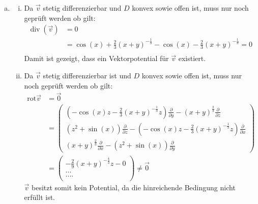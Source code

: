 \documentclass[10pt,a4paper,parskip=half]{scrartcl}
\begin{document}
\begin{enumerate}[(a)]
\begin{enumerate}[1.]
\end{enumerate}
\item 
\begin{enumerate}[(i)]
	\item 
Da $\vec v$ stetig differenzierbar und $D$ konvex sowie offen ist, muss nur noch geprüft werden ob gilt:
\begin{align*}
\operatorname{div} ( \vec v ) &= 0\\
&= \cos(x) + \frac 23(x+y)^{-\frac 13} - \cos (x) - \frac 23(x+y)^{-\frac 13} = 0\\
\end{align*}
Damit ist gezeigt, dass ein Vektorpotential für $\vec v$ existiert.
\item 
Da $\vec v$ stetig differenzierbar ist und $D$ konvex sowie offen ist, muss nur noch geprüft werden ob gilt:
\begin{align*}
\text{rot} \vec v &= \vec 0\\
&= \begin{pmatrix}
\left(-\cos(x)z-\frac 23(x+y)^{-\frac 13}z \right)\frac {\partial}{\partial y} - (x+y)^{\frac 23} \frac{\partial}{\partial z} \\
\left(z^2  + \sin(x)\right) \frac{\partial}{\partial z} -\left(-\cos(x)z-\frac 23(x+y)^{-\frac 13}z \right) \frac{\partial}{\partial x}\\
(x+y)^{\frac 23} \frac{\partial}{\partial x} - \left( z^2 + \sin(x) \right) \frac{\partial}{\partial y}
\end{pmatrix}\\
&= \begin{pmatrix}
-\frac 29(x+y)^{-\frac 43}z -0 \\
...\\
....\\
\end{pmatrix} \neq \vec 0
\end{align*}
$\vec v$ besitzt somit kein Potential, da die hinreichende Bedingung nicht erfüllt ist.
\end{enumerate}
\end{enumerate}
\end{document}
